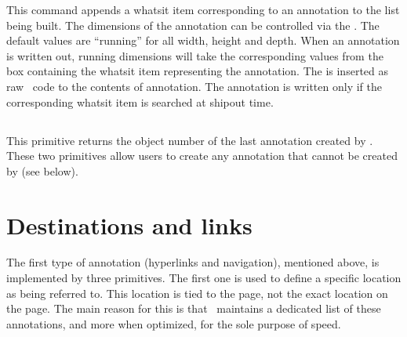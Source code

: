 \documentclass{pdftexmanual}
\begin{document}
\label{pdfannot}
This command appends a whatsit item corresponding to an annotation to
the list being built. The dimensions of the annotation can be controlled
via the . The default values are ``running'' for
all width, height and depth. When an annotation is written out, running
dimensions will take the corresponding values from the box containing
the whatsit item representing the annotation. The  is inserted as raw \PDF\ code to the contents of annotation. The
annotation is written only if the corresponding whatsit item is searched
at shipout time.

\subsection{}

This primitive returns the object number of the last annotation created by
. These two primitives allow users to create any annotation
that cannot be created by  (see below).

\section{Destinations and links}
\label{sec.linking}

The first type of annotation (hyperlinks and navigation), mentioned
above, is implemented by three primitives. The first one is used to
define a specific location as being referred to. This location is tied
to the page, not the exact location on the page. The main reason for
this is that \PDFTEX\ maintains a dedicated list of these annotations,
and more when optimized, for the sole purpose of speed.

\subsection{}

\noindent{}
\end{document}
